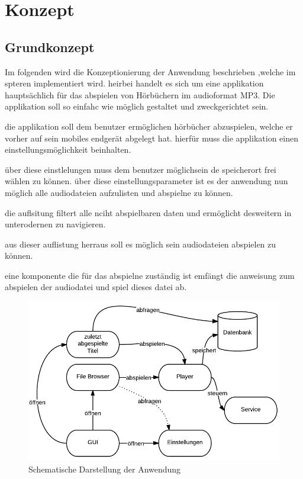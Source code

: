 \section{Konzept}
\subsection{Grundkonzept}

Im folgenden wird die Konzeptionierung der Anwendung beschrieben ,welche im spteren implementiert wird. heirbei handelt es sich um eine applikation hauptsächlich für das abspielen von Hörbüchern im audioformat MP3. Die applikation soll so einfahc wie möglich gestaltet und zweckgerichtet sein.

die applikation soll dem benutzer ermöglichen hörbücher abzuspielen, welche er vorher auf sein mobiles endgerät abgelegt hat. hierfür muss die applikation einen einstellungsmöglichkeit beinhalten.

über diese einstlelungen muss dem benutzer möglichsein de speicherort frei wählen zu können. über diese einstellungsparameter ist es der anwendung nun möglich alle audiodateien aufzulisten und abspielne zu können.

die auflsitung filtert alle nciht abspielbaren daten und ermöglicht desweitern in unterodernen zu navigieren.

aus dieser auflistung herraus soll es möglich sein audiodateien abspielen zu können.

eine komponente die für das abspielne zuständig ist emfängt die anweisung zum abspielen der audiodatei und spiel dieses datei ab.

\begin{center}
\begin{figure}
\includegraphics[scale=0.6]{images/konzept}
\caption{Schematische Darstellung der Anwendung}
\label{konzept}
\end{figure}
\end{center}

